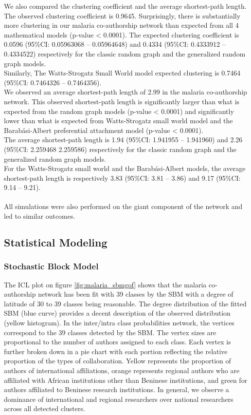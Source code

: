 We also compared the clustering coefficient and the average shortest-path length. The observed clustering coefficient is 0.9645. Surprisingly, there is substantially more clustering in our malaria co-authorship network than expected from all 4 mathematical models (p-value < 0.0001). The expected clustering coefficient is 0.0596 (95\%CI: 0.05963068 -- 0.05964648) and 0.4334 (95\%CI: 0.4333912 -- 0.4334522) respectively for the classic random graph and the generalized random graph models.\\
Similarly, The Watts-Strogatz Small World model expected clustering is 0.7464 (95\%CI: 0.7464326 -- 0.7464356).\\
We observed an average shortest-path length of 2.99 in the malaria co-authorship network. This observed shortest-path length is significantly larger than what is expected from the random graph models (p-value < 0.0001) and significantly lower than what is expected from Watts-Strogatz small world model and the Barab\'asi-Albert preferential attachment model (p-value < 0.0001).\\The average shortest-path length is 1.94 (95\%CI: 1.941955 -- 1.941960) and 2.26 (95\%CI: 2.259468 2.259586) respectively for the classic random graph and the generalized random graph models.\\For the Watts-Strogatz small world and the Barab\'asi-Albert models, the average shortest-path length is respectively 3.83 (95\%CI: 3.81 -- 3.86) and 9.17 (95\%CI: 9.14 -- 9.21).\\~\\
All simulations were also performed on the giant component of the network and led to similar outcomes.%

\subsection{Statistical Modeling}
\subsubsection{Stochastic Block Model}
\label{sec:malaria_results_sbm}
The ICL plot on figure \ref{fig:malaria_sbmgof} shows that the malaria co-authorship network has been fit with 39 classes by the SBM with a degree of latitude of 30 to 39 classes being reasonable. The degree distribution of the fitted SBM (blue curve) provides a decent description of the observed distribution (yellow histogram). In the inter/intra class probabilities network, the vertices correspond to the 39 classes detected by the SBM. The vertex sizes are proportional to the number of authors assigned to each class. Each vertex is further broken down in a pie chart with each portion reflecting the relative proportion of the types of collaboration. Yellow represents the proportion of authors of international affiliations, orange represents regional authors who are affiliated with African institutions other than Beninese institutions, and green for authors affiliated to Beninese research institutions. In general, we observe a dominance of international and regional researchers over national researchers across all detected clusters.


